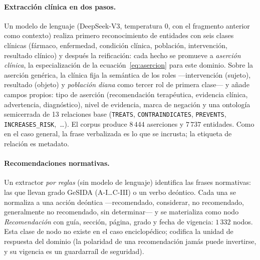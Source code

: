 \documentclass[11pt,a4paper]{article}
\begin{document}
\paragraph{Extracción clínica en dos pasos.}
Un modelo de lenguaje (DeepSeek-V3, temperatura $0$, con el fragmento
anterior como contexto) realiza primero reconocimiento de entidades con
seis clases clínicas (fármaco, enfermedad, condición clínica, población,
intervención, resultado clínico) y después la reificación: cada hecho se
promueve a \emph{aserción clínica}, la especialización de la
ecuación~\eqref{eq:asercion} para este dominio. Sobre la aserción genérica,
la clínica fija la semántica de los roles ---intervención (sujeto),
resultado (objeto) y \emph{población diana} como tercer rol de primera
clase--- y añade campos propios: tipo de aserción (recomendación
terapéutica, evidencia clínica, advertencia, diagnóstico), nivel de
evidencia, marca de negación y una ontología semicerrada de 13 relaciones
base (\texttt{TREATS}, \texttt{CONTRAINDICATES}, \texttt{PREVENTS},
\texttt{INCREASES\_RISK},~\dots). El corpus produce $8\,444$ aserciones y
$7\,737$ entidades. Como en el caso general, la frase verbalizada es lo que
se incrusta; la etiqueta de relación es metadato.

\paragraph{Recomendaciones normativas.}
Un extractor \emph{por reglas} (sin modelo de lenguaje) identifica las
frases normativas: las que llevan grado GeSIDA (\guillemotleft{}A-I\guillemotright{}\dots\guillemotleft{}C-III\guillemotright{})
o un verbo deóntico. Cada una se normaliza a una acción deóntica
---recomendado, considerar, no recomendado, generalmente no recomendado,
sin determinar--- y se materializa como nodo \emph{Recomendación} con
guía, sección, página, grado y fecha de vigencia: $1\,332$ nodos. Esta
clase de nodo no existe en el caso enciclopédico; codifica la unidad de
respuesta del dominio (la polaridad de una recomendación jamás puede
invertirse, y su vigencia es un guardarraíl de seguridad).
\end{document}
